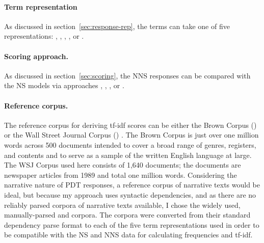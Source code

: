 \paragraph{Term representation} As discussed in
section~\ref{sec:response-rep}, the terms can take one of five
representations: , , , ,
or .

\paragraph{Scoring approach.} As discussed in
section~\ref{sec:scoring}, the NNS responses can be
compared with the NS models via approaches , , , or .

\paragraph{Reference corpus.} The reference corpus for deriving tf-idf
scores can be either the Brown Corpus () \citep{kucera:francis:67} or the Wall Street Journal Corpus () \citep{marcus-et-al:93}. The Brown Corpus is just over one million words across 500 documents intended to cover a broad range of genres, registers, and contents and to serve as a sample of the written English language at large.
The WSJ Corpus used here consists of 1,640 documents; the documents are newspaper articles from 1989 and total one million words. Considering the narrative nature of PDT responses, a reference corpus of narrative texts would be ideal, but because my approach uses syntactic dependencies, and as there are no reliably parsed corpora of narrative texts available, I chose the widely used, manually-parsed  and  corpora. The corpora were converted from their standard dependency parse format to each of the five term representations used in order to be compatible with the NS and NNS data for calculating frequencies and tf-idf.

%
